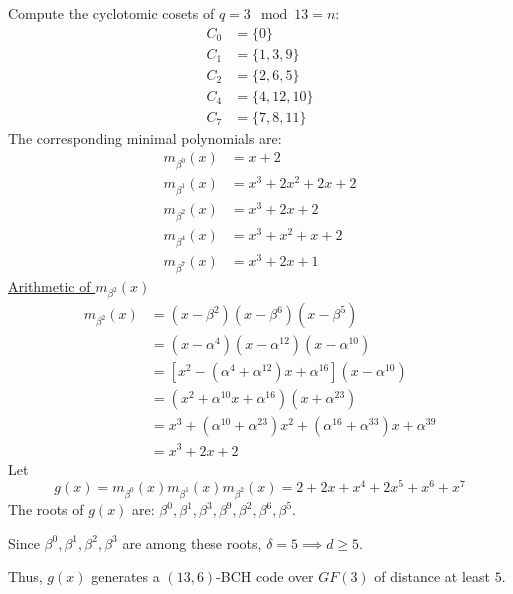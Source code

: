 \begin{exbox}
\begin{example}
        Compute the cyclotomic cosets of $ q=3\mod 13=n $:
        \begin{align*}
            C_0 & =\{0\}       \\
            C_1 & =\{1,3,9\}   \\
            C_2 & =\{2,6,5\}   \\
            C_4 & =\{4,12,10\} \\
            C_7 & =\{7,8,11\}
        \end{align*}
        The corresponding minimal polynomials are:
        \begin{align*}
            m_{\beta^0}(x) & =x+2           \\
            m_{\beta^1}(x) & =x^3+2x^2+2x+2 \\
            m_{\beta^2}(x) & =x^3+2x+2      \\
            m_{\beta^4}(x) & =x^3+x^2+x+2   \\
            m_{\beta^7}(x) & =x^3+2x+1
        \end{align*}
        \underline{Arithmetic of $ m_{\beta^2}(x) $}
        \begin{align*}
            m_{\beta^2}(x)
             & =(x-\beta^2)(x-\beta^6)(x-\beta^5)                                     \\
             & =(x-\alpha^4)(x-\alpha^{12})(x-\alpha^{10})                            \\
             & =\left[ x^2-(\alpha^4+\alpha^{12})x+\alpha^{16} \right](x-\alpha^{10}) \\
             & =(x^2+\alpha^{10}x+\alpha^{16})(x+\alpha^{23})                         \\
             & =x^3+(\alpha^{10}+\alpha^{23})x^2+(\alpha^{16}+\alpha^{33})x+
            \alpha^{39}                                                               \\
             & =x^3+2x+2
        \end{align*}
        Let
        \[ g(x)=m_{\beta^0}(x)m_{\beta^1}(x)m_{\beta^2}(x)=2+2x+x^4+2x^5+x^6+x^7 \]
        The roots of $ g(x) $ are:
        $ \beta^0,\beta^1,\beta^3,\beta^9,\beta^2,\beta^6,\beta^5 $.

        Since $ \beta^0,\beta^1,\beta^2,\beta^3 $ are among these roots,
        $ \delta=5\implies d\geqslant 5 $.

        Thus, $ g(x) $ generates a $ (13,6) $-BCH code over $ GF(3) $
        of distance at least $ 5 $.
    \end{example}
\end{exbox}

